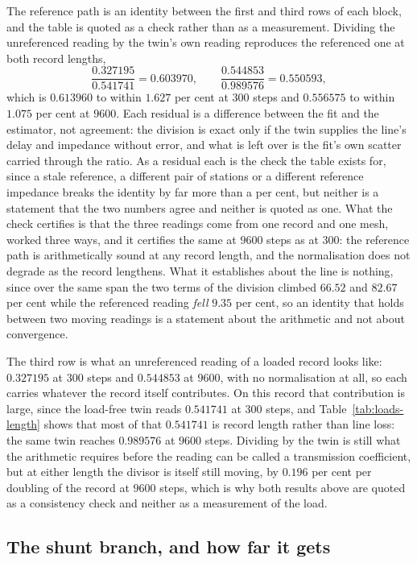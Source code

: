 The reference path is an identity between the first and third rows of each block, and the table is quoted as a check rather than
as a measurement. Dividing the unreferenced reading by the twin's own reading reproduces the referenced one at both
record lengths,
\[
  \frac{0.327195}{0.541741} = 0.603970, \qquad \frac{0.544853}{0.989576} = 0.550593,
\]
which is $0.613960$ to within $1.627$ per cent at $300$ steps and $0.556575$ to within $1.075$ per cent at $9600$.
Each residual is a difference between the fit and the estimator, not agreement: the division is exact only if the
twin supplies the line's delay and impedance without error, and what is left over is the fit's own scatter carried
through the ratio. As a residual each is the check the table exists for, since a stale reference, a different pair
of stations or a different reference impedance breaks the identity by far more than a per cent, but neither is a
statement that the two numbers agree and neither is quoted as one. What the check certifies is that the three
readings come from one record and one mesh, worked three ways, and it certifies the same at $9600$ steps as at
$300$: the reference path is arithmetically sound at any record length, and the normalisation does not degrade as
the record lengthens. What it establishes about the line is nothing, since over the same span the two terms of the
division climbed $66.52$ and $82.67$ per cent while the referenced reading \emph{fell} $9.35$ per cent, so an
identity that holds between two moving readings is a statement about the arithmetic and not about convergence.

The third row is what an unreferenced reading of a loaded record looks like: $0.327195$ at $300$ steps and
$0.544853$ at $9600$, with no normalisation at all, so each carries whatever the record itself contributes. On this
record that contribution is large, since the load-free twin reads $0.541741$ at $300$ steps, and
Table~\ref{tab:loads-length} shows that most of that $0.541741$ is record length rather than line loss: the same
twin reaches $0.989576$ at $9600$ steps. Dividing by the twin is still what the arithmetic requires before the
reading can be called a transmission coefficient, but at either length the divisor is itself still moving, by
$0.196$ per cent per doubling of the record at $9600$ steps, which is why both results above are quoted as a
consistency check and neither as a measurement of the load.

\subsection{The shunt branch, and how far it gets}
\label{sec:loads-shunt}

